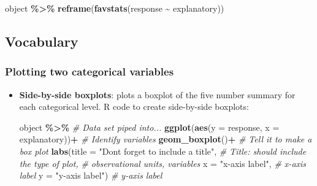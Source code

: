 \documentclass[
]{report}
\newenvironment{Shaded}{\begin{snugshade}}{\end{snugshade}}
\newcommand{\AttributeTok}[1]{\textcolor[rgb]{0.13,0.29,0.53}{#1}}
\newcommand{\CommentTok}[1]{\textcolor[rgb]{0.56,0.35,0.01}{\textit{#1}}}
\newcommand{\FunctionTok}[1]{\textcolor[rgb]{0.13,0.29,0.53}{\textbf{#1}}}
\newcommand{\NormalTok}[1]{#1}
\newcommand{\SpecialCharTok}[1]{\textcolor[rgb]{0.81,0.36,0.00}{\textbf{#1}}}
\newcommand{\StringTok}[1]{\textcolor[rgb]{0.31,0.60,0.02}{#1}}
\begin{document}
\begin{Shaded}
\begin{Highlighting}[]
\NormalTok{object }\SpecialCharTok{\%\textgreater{}\%}
  \FunctionTok{reframe}\NormalTok{(}\FunctionTok{favstats}\NormalTok{(response }\SpecialCharTok{\textasciitilde{}}\NormalTok{ explanatory))}
\end{Highlighting}
\end{Shaded}

\subsection{Vocabulary}\label{vocabulary}

\subsubsection*{Plotting two categorical variables}\label{plotting-two-categorical-variables}

\begin{itemize}
\item
  \textbf{Side-by-side boxplots}: plots a boxplot of the five number summary for each categorical level. R code to create side-by-side boxplots:

\begin{Shaded}
\begin{Highlighting}[]
\NormalTok{object }\SpecialCharTok{\%\textgreater{}\%}  \CommentTok{\# Data set piped into...}
  \FunctionTok{ggplot}\NormalTok{(}\FunctionTok{aes}\NormalTok{(}\AttributeTok{y =}\NormalTok{ response, }\AttributeTok{x =}\NormalTok{ explanatory))}\SpecialCharTok{+}  \CommentTok{\# Identify variables}
  \FunctionTok{geom\_boxplot}\NormalTok{()}\SpecialCharTok{+}  \CommentTok{\# Tell it to make a box plot}
  \FunctionTok{labs}\NormalTok{(}\AttributeTok{title =} \StringTok{"Don\textquotesingle{}t forget to include a title"}\NormalTok{,  }\CommentTok{\# Title: should include the type of plot,}
   \CommentTok{\# observational units, variables}
   \AttributeTok{x =} \StringTok{"x{-}axis label"}\NormalTok{,    }\CommentTok{\# x{-}axis label}
   \AttributeTok{y =} \StringTok{"y{-}axis label"}\NormalTok{)  }\CommentTok{\# y{-}axis label}
\end{Highlighting}
\end{Shaded}
\end{itemize}

\vspace{1mm}
\end{document}
